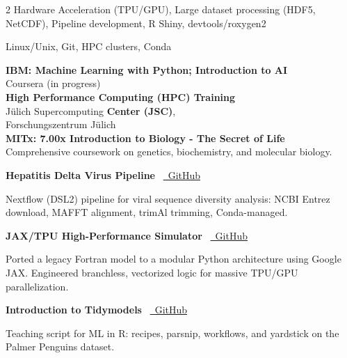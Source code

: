 \documentclass{thejus_cv}
\begin{document}
\begin{paracol}{2}
         {Hardware Acceleration (TPU/GPU), Large dataset processing (HDF5, NetCDF), Pipeline development, R Shiny, devtools/roxygen2}

         {Linux/Unix, Git, HPC clusters, Conda}



\textbf{IBM: Machine Learning with Python; Introduction to AI}\\
{\small Coursera (in progress)}\\[0.3cm]

\textbf{High Performance Computing (HPC) Training}\\
J\"ulich Supercomputing \textbf{Center (JSC)},\\
Forschungszentrum J\"ulich\\[0.3cm]

\textbf{MITx: 7.00x Introduction to Biology - The Secret of Life}\\
{\small Comprehensive coursework on genetics, biochemistry, and molecular biology.}\\[0.4cm]


\textbf{Hepatitis Delta Virus Pipeline} \textbullet\ \href{https://github.com/thejusmahajan/hepatitis-delta-pipeline}{\faGithub\ GitHub}\par
{\small Nextflow (DSL2) pipeline for viral sequence diversity analysis: NCBI Entrez download, MAFFT alignment, trimAl trimming, Conda-managed.}\par
\vspace{0.3em}

\textbf{JAX/TPU High-Performance Simulator} \textbullet\ \href{https://github.com/thejusmahajan/Agent_Based_Phytoplankton_Model-IBM-Phytoplankton}{\faGithub\ GitHub}\par
{\small Ported a legacy Fortran model to a modular Python architecture using Google JAX. Engineered branchless, vectorized logic for massive TPU/GPU parallelization.}\par
\vspace{0.3em}

\textbf{Introduction to Tidymodels} \textbullet\ \href{https://github.com/thejusmahajan/Introduction_to_Tidymodels}{\faGithub\ GitHub}\par
{\small Teaching script for ML in R: recipes, parsnip, workflows, and yardstick on the Palmer Penguins dataset.}\par
\vspace{0.3em}


\end{paracol}
\end{document}
